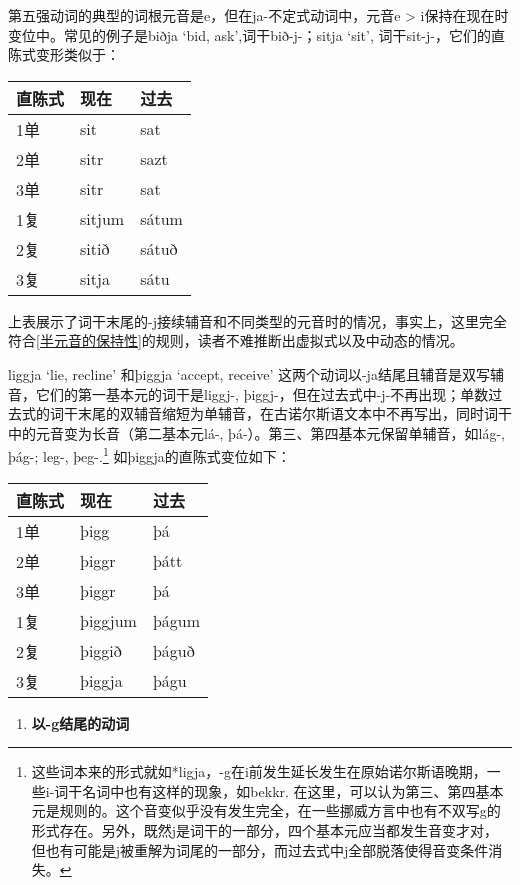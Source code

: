 第五强动词的典型的词根元音是e，但在ja-不定式动词中，元音e \textgreater{}
i保持在现在时变位中。常见的例子是biðja `bid, ask‌',词干bið-j-；sitja
`sit‌', 词干sit-j-，它们的直陈式变形类似于：

\begin{longtable}{lll}
  \toprule
  直陈式 & 现在     & 过去    \\
  \midrule
  \endhead
  \bottomrule
  \endfoot
  1单  & sit    & sat   \\
  2单  & sitr   & sazt  \\
  3单  & sitr   & sat   \\
  1复  & sitjum & sátum \\
  2复  & sitið  & sátuð \\
  3复  & sitja  & sátu  \\
\end{longtable}

上表展示了词干末尾的-j接续辅音和不同类型的元音时的情况，事实上，这里完全符合\ref{半元音的保持性}的规则，读者不难推断出虚拟式以及中动态的情况。

liggja `lie, recline‌' 和þiggja `accept, receive‌'
这两个动词以-ja结尾且辅音是双写辅音，它们的第一基本元的词干是liggj-,
þiggj-，但在过去式中-j-不再出现；单数过去式的词干末尾的双辅音缩短为单辅音，在古诺尔斯语文本中不再写出，同时词干中的元音变为长音（第二基本元lá-,
þá-）。第三、第四基本元保留单辅音，如lág-, þág-; leg-, þeg-.\footnote{这些词本来的形式就如*ligja，-g在i前发生延长发生在原始诺尔斯语晚期，一些i-词干名词中也有这样的现象，如bekkr.
  在这里，可以认为第三、第四基本元是规则的。这个音变似乎没有发生完全，在一些挪威方言中也有不双写g的形式存在。另外，既然j是词干的一部分，四个基本元应当都发生音变才对，但也有可能是j被重解为词尾的一部分，而过去式中j全部脱落使得音变条件消失。}
如þiggja的直陈式变位如下：

\begin{longtable}{lll}
  \toprule
  直陈式 & 现在      & 过去    \\
  \midrule
  \endhead
  \bottomrule
  \endfoot
  1单  & þigg    & þá    \\
  2单  & þiggr   & þátt  \\
  3单  & þiggr   & þá    \\
  1复  & þiggjum & þágum \\
  2复  & þiggið  & þáguð \\
  3复  & þiggja  & þágu  \\
\end{longtable}

\begin{enumerate}
  \def\labelenumi{\arabic{enumi})}
  \setcounter{enumi}{1}
  \item
        \textbf{以-g结尾的动词}
\end{enumerate}

